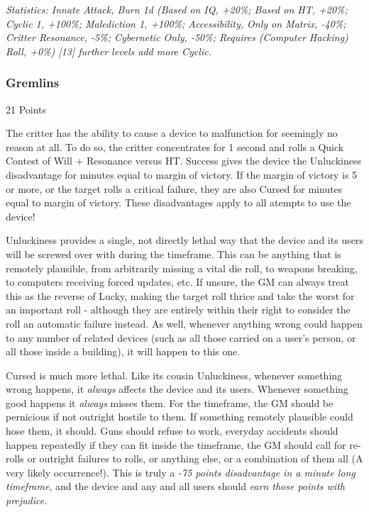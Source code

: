 \begin{multicols*}{3}
	\textcolor{OliveGreen}{\textit{Statistics: Innate Attack, Burn 1d (Based on IQ, +20\%; Based on HT, +20\%; Cyclic 1, +100\%; Malediction 1, +100\%; Accessibility, Only on Matrix, -40\%; Critter Resonance, -5\%; Cybernetic Only, -50\%; Requires (Computer Hacking) Roll, +0\%) [13] further levels add more Cyclic.}}

	\subsubsection{Gremlins}\label{gremlins}
	\begin{flushright}
		21 Points
	\end{flushright}

	The critter has the ability to cause a device to malfunction for seemingly no reason at all. To do so, the critter concentrates for 1 second and rolls a Quick Contest of Will + Resonance versus HT. Success gives the device the Unluckiness disadvantage for minutes equal to margin of victory. If the margin of victory is 5 or more, or the target rolls a critical failure, they are also Cursed for minutes equal to margin of victory. These disadvantages apply to all atempts to use the device!
	
	Unluckiness provides a single, not directly lethal way that the device and its users will be screwed over with during the timeframe. This can be anything that is remotely plausible, from arbitrarily missing a vital die roll, to weapons breaking, to computers receiving forced updates, etc. If unsure, the GM can always treat this as the reverse of Lucky, making the target roll thrice and take the worst for an important roll - although they are entirely within their right to consider the roll an automatic failure instead. As well, whenever anything wrong could happen to any number of related devices (such as all those carried on a user's person, or all those inside a building), it will happen to this one.
	
	Cursed is much more lethal. Like its cousin Unluckiness, whenever something wrong happens, it \textit{always} affects the device and its users. Whenever something good happens it \textit{always} misses them. For the timeframe, the GM should be pernicious if not outright hostile to them. If something remotely plausible could hose them, it should. Guns should refuse to work, everyday accidents should happen repeatedly if they can fit inside the timeframe, the GM should call for re-rolls or outright failures to rolls, or anything else, or a combination of them all (A very likely occurrence!). This is truly a \textit{-75 points disadvantage in a minute long timeframe}, and the device and any and all users should \textit{earn those points with prejudice.}


\end{multicols*}
